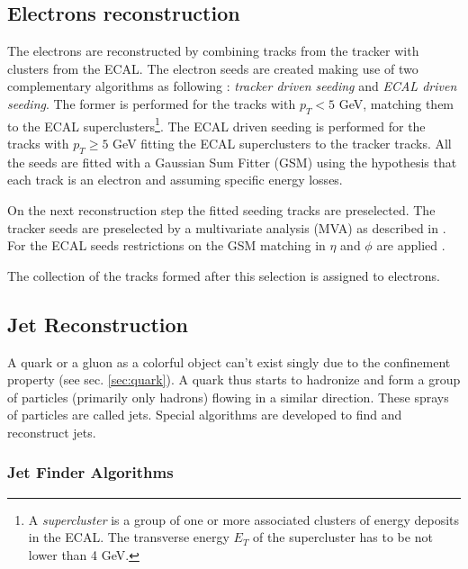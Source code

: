 \subsection{Electrons reconstruction}\label{ssec:ElRec}

The electrons are reconstructed by combining tracks from the tracker with clusters from the ECAL. The electron seeds
are created making use of two complementary algorithms as following \cite{CMS-PAS-EGM-10-004}: \textit{tracker driven seeding}
and \textit{ECAL driven seeding}. The former is performed for the tracks with $p_{T} < 5$ GeV, matching them to the ECAL superclusters\footnote
{A \textit{supercluster} is a group of one or more associated clusters of energy deposits in the ECAL. The transverse energy $E_{T}$
of the supercluster has to be not lower than 4 GeV.}. The ECAL driven seeding is performed for the tracks with $p_{T} \geq 5$ GeV
fitting the ECAL superclusters to the tracker tracks. All the seeds are fitted with a Gaussian Sum Fitter (GSM) \cite{GSF_Electron_Reconstruction_CMS}
using the hypothesis that each track is an electron and assuming specific energy losses.

On the next reconstruction step the fitted seeding tracks are preselected. The tracker seeds are preselected by a multivariate analysis 
(MVA) as described in \cite{CMS:2010byl}. For the ECAL seeds restrictions on the GSM matching in $\eta$ and $\phi$ are applied \cite{Baffioni:2006cd}.

The collection of the tracks formed after this selection is assigned to electrons.

\subsection{Jet Reconstruction}

A quark or a gluon as a colorful object can't exist singly due to the confinement property (see sec. \ref{sec:quark}).
A quark thus starts to hadronize and form a group of particles (primarily only hadrons) flowing in a similar direction. These sprays of 
particles are called jets. Special algorithms are developed to find and reconstruct jets.

\subsubsection{Jet Finder Algorithms}\label{sec:JetAlgo}

